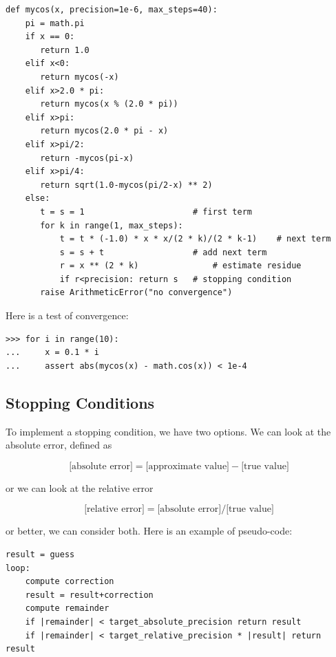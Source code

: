 \documentclass[justified, sixbynine]{tufte-book}
\def\ft{\small\tt}
\theoremstyle{plain}%
\newtheorem * {corollary}{Corollary}
\theoremstyle{definition}
\theoremstyle{remark}
\newtheorem * {remark}{Remark}
\newtheorem * {note}{Note}
\begin{document}
\begin{fullwidth}
\begin{lstlisting}[caption={in file: {\ft nlib.py}}]
def mycos(x, precision=1e-6, max_steps=40):
    pi = math.pi
    if x == 0:
       return 1.0
    elif x<0:
       return mycos(-x)
    elif x>2.0 * pi:
       return mycos(x % (2.0 * pi))
    elif x>pi:
       return mycos(2.0 * pi - x)
    elif x>pi/2:
       return -mycos(pi-x)
    elif x>pi/4:
       return sqrt(1.0-mycos(pi/2-x) ** 2)
    else:
       t = s = 1                      # first term
       for k in range(1, max_steps):
           t = t * (-1.0) * x * x/(2 * k)/(2 * k-1)    # next term
           s = s + t                  # add next term
           r = x ** (2 * k)               # estimate residue
           if r<precision: return s   # stopping condition
       raise ArithmeticError("no convergence")
\end{lstlisting}

Here is a test of convergence:

\begin{lstlisting}[caption={in file: {\ft nlib.py}}]
>>> for i in range(10):
...     x = 0.1 * i
...     assert abs(mycos(x) - math.cos(x)) < 1e-4
\end{lstlisting}

\goodbreak\subsection{Stopping Conditions}


To implement a stopping condition, we have two options. We can look at the absolute error, defined as

\begin{equation}
\textrm{[absolute error]}=\textrm{[approximate value]}-\textrm{[true value]}
\end{equation}

or we can look at the relative error

\begin{equation}
\textrm{[relative error]}=\textrm{[absolute error]}/\textrm{[true value]}
\end{equation}

or better, we can consider both. Here is an example of pseudo-code:

\begin{lstlisting}
result = guess
loop:
    compute correction
    result = result+correction
    compute remainder
    if |remainder| < target_absolute_precision return result
    if |remainder| < target_relative_precision * |result| return result
\end{lstlisting}


\end{fullwidth}
\end{document}
